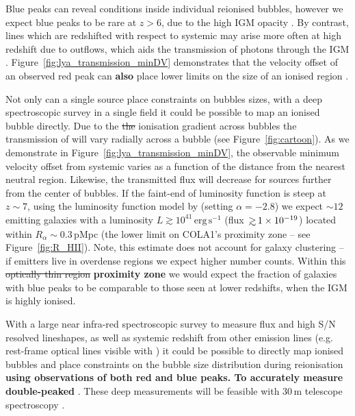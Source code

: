 \documentclass[fleqn,usenatbib]{mnras}
\providecommand{\DIFadd}[1]{{\protect\color{Green} {\bf #1}}} %
\providecommand{\DIFdel}[1]{{\protect\color{Gray} \scriptsize \sout{#1}}} %
\providecommand{\DIFaddbegin}{} %
\providecommand{\DIFaddend}{} %
\providecommand{\DIFdelbegin}{} %
\providecommand{\DIFdelend}{} %
\newcommand{\DIFscaledelfig}{0.5}
\newlength{\DIFdelgraphicswidth} %
\newlength{\DIFdelgraphicsheight} %
\newcommand{\DIFaddincludegraphics}[2][]{{\color{purple}\fbox{\DIFOincludegraphics[#1]{#2}}}} %
\newcommand{\DIFdelincludegraphics}[2][]{%
\sbox{\DIFdelgraphicsbox}{\DIFOincludegraphics[#1]{#2}}%
\settoboxwidth{\DIFdelgraphicswidth}{\DIFdelgraphicsbox} %
\settoboxtotalheight{\DIFdelgraphicsheight}{\DIFdelgraphicsbox} %
\scalebox{\DIFscaledelfig}{%
\parbox[b]{\DIFdelgraphicswidth}{\usebox{\DIFdelgraphicsbox}\\[-\baselineskip] \rule{\DIFdelgraphicswidth}{0em}}\llap{\resizebox{\DIFdelgraphicswidth}{\DIFdelgraphicsheight}{%
\setlength{\unitlength}{\DIFdelgraphicswidth}%
\begin{picture}(1,1)%
\thicklines\linethickness{2pt} %
{\color[rgb]{1,0,0}\put(0,0){\framebox(1,1){}}}%
{\color[rgb]{1,0,0}\put(0,0){\line( 1,1){1}}}%
{\color[rgb]{1,0,0}\put(0,1){\line(1,-1){1}}}%
\end{picture}%
}\hspace*{3pt}}} %
} %
\DeclareRobustCommand{\DIFaddbegin}{\DIFOaddbegin \let\includegraphics\DIFaddincludegraphics} %
\DeclareRobustCommand{\DIFaddend}{\DIFOaddend \let\includegraphics\DIFOincludegraphics} %
\DeclareRobustCommand{\DIFdelbegin}{\DIFOdelbegin \let\includegraphics\DIFdelincludegraphics} %
\DeclareRobustCommand{\DIFdelend}{\DIFOaddend \let\includegraphics\DIFOincludegraphics} %
\begin{document}
Blue \lya peaks can reveal conditions inside individual reionised bubbles, however we expect blue peaks to be rare at $z>6$, due to the high IGM opacity \citep[see \S~\ref{sec:results_opticallythin} and e.g.,][]{Laursen2011} . By contrast, \lya lines which are redshifted with respect to systemic may arise more often at high redshift due to outflows, which aids the transmission of photons through the IGM \citep{Dijkstra2011}. Figure~\ref{fig:lya_transmission_minDV} demonstrates that the velocity offset of an observed red peak can \DIFaddbegin \DIFadd{also }\DIFaddend place lower limits on the size of an ionised region \citep[see also][]{Malhotra2006}.

Not only can a single source place constraints on bubbles sizes, with a deep spectroscopic survey in a single field it could be possible to map an ionised bubble directly. Due to the \DIFdelbegin \DIFdel{the }\DIFdelend ionisation gradient across bubbles the transmission of \lya will vary radially across a bubble (see Figure~\ref{fig:cartoon}). As we demonstrate in Figure~\ref{fig:lya_transmission_minDV}, the observable minimum velocity offset from systemic varies as a function of the distance from the nearest neutral region. Likewise, the transmitted \lya flux will decrease for sources further from the center of bubbles. 
If the faint-end of \lya luminosity function is steep \citep[e.g., $\alpha\sim-2.8$][]{Drake2017} at $z\sim7$, using the luminosity function model by \citet{Gronke2015} (setting $\alpha=-2.8$) we expect $\sim 12$ \lya emitting galaxies with a luminosity $L\gtrsim 10^{41}\,\mathrm{erg}\,\mathrm{s}^{-1}$ (flux $\simgt 1\times10^{-19}$\fdens) located within $R_\alpha \sim 0.3\,$pMpc (the lower limit on COLA1's proximity zone -- see Figure~\ref{fig:R_HII}). Note, this estimate does not account for galaxy clustering -- if \lya emitters live in overdense regions \citep{Ouchi2017} we expect higher number counts. Within this \DIFdelbegin \DIFdel{optically thin region }\DIFdelend \DIFaddbegin \DIFadd{proximity zone }\DIFaddend we would expect the fraction of galaxies with blue \lya peaks to be comparable to those seen at lower redshifts, when the IGM is highly ionised. 

With a large near infra-red spectroscopic survey to measure \lya flux and high S/N resolved lineshapes, as well as systemic redshift from other emission lines (e.g. rest-frame optical lines visible with \JWST) it could be possible to directly map ionised bubbles and place constraints on the bubble size distribution during reionisation \DIFaddbegin \DIFadd{using observations of both red and blue peaks. To accurately measure double-peaked }\lya \DIFadd{line shapes requires a spectral resolution $R\simgt4000$ with S/N$\simgt2$ per pixel }\citep[e.g.,][]{Verhamme2015}\DIFaddend . These deep measurements will be feasible with 30\,m telescope spectroscopy \citep[e.g., E-ELT/MOSAIC is expected to reach $1\times10^{-19}$\fdens in 40 hrs,][]{Evans2015}.
\end{document}
